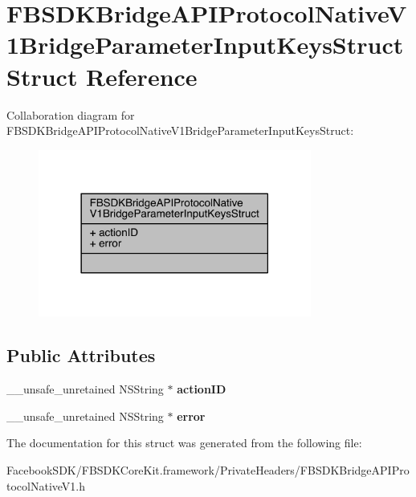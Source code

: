 \hypertarget{struct_f_b_s_d_k_bridge_a_p_i_protocol_native_v1_bridge_parameter_input_keys_struct}{\section{F\-B\-S\-D\-K\-Bridge\-A\-P\-I\-Protocol\-Native\-V1\-Bridge\-Parameter\-Input\-Keys\-Struct Struct Reference}
\label{struct_f_b_s_d_k_bridge_a_p_i_protocol_native_v1_bridge_parameter_input_keys_struct}
}


Collaboration diagram for F\-B\-S\-D\-K\-Bridge\-A\-P\-I\-Protocol\-Native\-V1\-Bridge\-Parameter\-Input\-Keys\-Struct\-:
\nopagebreak
\begin{figure}[H]
\begin{center}
\leavevmode
\includegraphics[width=254pt]{struct_f_b_s_d_k_bridge_a_p_i_protocol_native_v1_bridge_parameter_input_keys_struct__coll__graph}
\end{center}
\end{figure}
\subsection*{Public Attributes}
\begin{DoxyCompactItemize}
\item 
\hypertarget{struct_f_b_s_d_k_bridge_a_p_i_protocol_native_v1_bridge_parameter_input_keys_struct_aee55b90539a845303df300d93f5309d0}{\-\_\-\-\_\-unsafe\-\_\-unretained N\-S\-String $\ast$ {\bfseries action\-I\-D}}\label{struct_f_b_s_d_k_bridge_a_p_i_protocol_native_v1_bridge_parameter_input_keys_struct_aee55b90539a845303df300d93f5309d0}

\item 
\hypertarget{struct_f_b_s_d_k_bridge_a_p_i_protocol_native_v1_bridge_parameter_input_keys_struct_a2fec9727c5bde36e86e39a3a407ef8dc}{\-\_\-\-\_\-unsafe\-\_\-unretained N\-S\-String $\ast$ {\bfseries error}}\label{struct_f_b_s_d_k_bridge_a_p_i_protocol_native_v1_bridge_parameter_input_keys_struct_a2fec9727c5bde36e86e39a3a407ef8dc}

\end{DoxyCompactItemize}


The documentation for this struct was generated from the following file\-:\begin{DoxyCompactItemize}
\item 
Facebook\-S\-D\-K/\-F\-B\-S\-D\-K\-Core\-Kit.\-framework/\-Private\-Headers/F\-B\-S\-D\-K\-Bridge\-A\-P\-I\-Protocol\-Native\-V1.\-h\end{DoxyCompactItemize}
